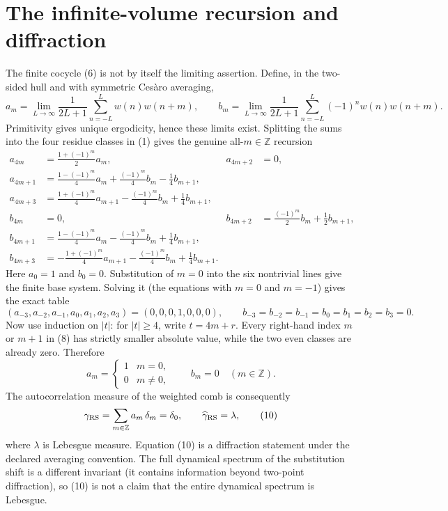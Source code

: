 \documentclass[10pt]{article}
\begin{document}
\section{The infinite-volume recursion and diffraction}
The finite cocycle (6) is not by itself the limiting assertion.  Define, in
the two-sided hull and with symmetric Ces\`aro averaging,
\[
 a_m=\lim_{L\to\infty}\frac1{2L+1}\sum_{n=-L}^Lw(n)w(n+m),\qquad
 b_m=\lim_{L\to\infty}\frac1{2L+1}\sum_{n=-L}^L(-1)^nw(n)w(n+m).       \tag{7}
\]
Primitivity gives unique ergodicity, hence these limits exist.  Splitting the
sums into the four residue classes in (1) gives the genuine all-$m\in\mathbb Z$
recursion
\begin{align*}
a_{4m}&=\tfrac{1+(-1)^m}{2}a_m,&a_{4m+2}&=0,\\
a_{4m+1}&=\tfrac{1-(-1)^m}{4}a_m+\tfrac{(-1)^m}{4}b_m-\tfrac14b_{m+1},\\
a_{4m+3}&=\tfrac{1+(-1)^m}{4}a_{m+1}-\tfrac{(-1)^m}{4}b_m+\tfrac14b_{m+1},\\
b_{4m}&=0,&b_{4m+2}&=\tfrac{(-1)^m}{2}b_m+\tfrac12b_{m+1},\\
b_{4m+1}&=\tfrac{1-(-1)^m}{4}a_m-\tfrac{(-1)^m}{4}b_m+\tfrac14b_{m+1},\\
b_{4m+3}&=-\tfrac{1+(-1)^m}{4}a_{m+1}-\tfrac{(-1)^m}{4}b_m+\tfrac14b_{m+1}. \tag{8}
\end{align*}
Here $a_0=1$ and $b_0=0$.  Substitution of $m=0$ into the six nontrivial
lines give the finite base system.  Solving it (the equations with $m=0$ and
$m=-1$) gives the exact table
\[
 (a_{-3},a_{-2},a_{-1},a_0,a_1,a_2,a_3)=(0,0,0,1,0,0,0),
 \qquad b_{-3}=b_{-2}=b_{-1}=b_0=b_1=b_2=b_3=0 .                 \tag{9}
\]
Now use induction on $|t|$: for $|t|\ge4$, write $t=4m+r$.  Every right-hand
index $m$ or $m+1$ in (8) has strictly smaller absolute value, while the two
even classes are already zero.  Therefore
\[
 a_m=\begin{cases}1&m=0,\\0&m\ne0,\end{cases}\qquad b_m=0\quad(m\in\mathbb Z).
\]
The autocorrelation measure of the weighted comb is consequently
\[
 \gamma_{\rm RS}=\sum_{m\in\mathbb Z}a_m\,\delta_m=\delta_0,
 \qquad \widehat\gamma_{\rm RS}=\lambda,                         \tag{10}
\]
where $\lambda$ is Lebesgue measure.  Equation (10) is a diffraction statement
under the declared averaging convention.  The full dynamical spectrum of the
substitution shift is a different invariant (it contains information beyond
two-point diffraction), so (10) is not a claim that the entire dynamical
spectrum is Lebesgue.
\fi
\end{document}
